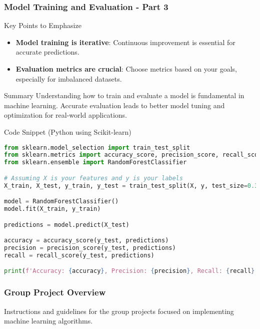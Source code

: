 \documentclass[aspectratio=169]{beamer}
\begin{document}
\begin{frame}[fragile]
    \frametitle{Model Training and Evaluation - Part 3}

    \begin{block}{Key Points to Emphasize}
        \begin{itemize}
            \item \textbf{Model training is iterative}: Continuous improvement is essential for accurate predictions.
            \item \textbf{Evaluation metrics are crucial}: Choose metrics based on your goals, especially for imbalanced datasets.
        \end{itemize}
    \end{block}

    \begin{block}{Summary}
        Understanding how to train and evaluate a model is fundamental in machine learning. Accurate evaluation leads to better model tuning and optimization for real-world applications.
    \end{block}

    \begin{block}{Code Snippet (Python using Scikit-learn)}
    \begin{lstlisting}[language=Python]
from sklearn.model_selection import train_test_split
from sklearn.metrics import accuracy_score, precision_score, recall_score
from sklearn.ensemble import RandomForestClassifier

# Assuming X is your features and y is your labels
X_train, X_test, y_train, y_test = train_test_split(X, y, test_size=0.3, random_state=42)

model = RandomForestClassifier()
model.fit(X_train, y_train)

predictions = model.predict(X_test)

accuracy = accuracy_score(y_test, predictions)
precision = precision_score(y_test, predictions)
recall = recall_score(y_test, predictions)

print(f'Accuracy: {accuracy}, Precision: {precision}, Recall: {recall}')
    \end{lstlisting}
    \end{block}
\end{frame}

\begin{frame}[fragile]
  \frametitle{Group Project Overview}
  Instructions and guidelines for the group projects focused on implementing machine learning algorithms.
\end{frame}
\end{document}

